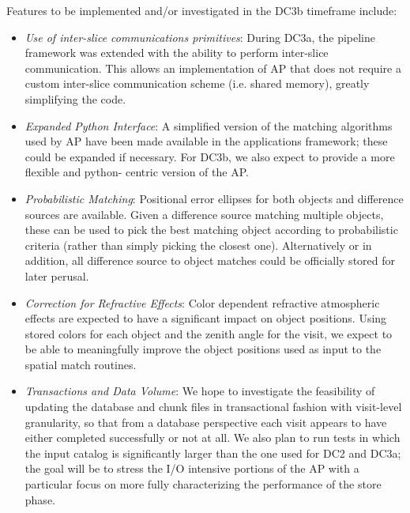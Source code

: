 Features to be implemented and/or investigated in the DC3b timeframe include:
\begin{itemize}
\item \emph{Use of inter-slice communications primitives}:
    During DC3a, the pipeline framework was extended with the ability to
    perform inter-slice communication. This allows an implementation of AP
    that does not require a custom inter-slice communication scheme (i.e.
    shared memory), greatly simplifying the code.
\item \emph{Expanded Python Interface}:
    A simplified version of the matching algorithms used by AP have been made
    available in the applications framework; these could be expanded if
    necessary. For DC3b, we also expect to provide a more flexible and python-
    centric version of the AP.
\item \emph{Probabilistic Matching}:
    Positional error ellipses for both objects and difference sources are
    available. Given a difference source matching multiple objects, these
    can be used to pick the best matching object according to probabilistic
    criteria (rather than simply picking the closest one). Alternatively
    or in addition, all difference source to object matches could be
    officially stored for later perusal.
\item \emph{Correction for Refractive Effects}:
    Color dependent refractive atmospheric effects are expected to have a
    significant impact on object positions. Using stored colors for each
    object and the zenith angle for the visit, we expect to be able to
    meaningfully improve the object positions used as input to the spatial
    match routines.
\item \emph{Transactions and Data Volume}:
    We hope to investigate the feasibility of updating the database and chunk
    files in transactional fashion with visit-level granularity, so that from
    a database perspective each visit appears to have either completed
    successfully or not at all. We also plan to run tests in which the input
     catalog is significantly larger than the one used for DC2
    and DC3a; the goal will be to stress the I/O intensive portions of the AP
    with a particular focus on more fully characterizing the performance of
    the store phase.
\end{itemize}


